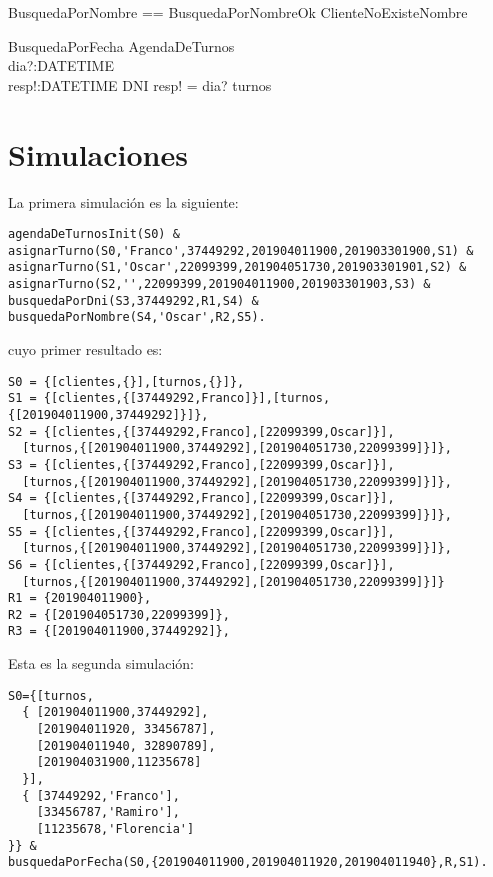 \documentclass[%
  fleqn,colorlinks,linkcolor=blue,citecolor=blue,urlcolor=blue]{eptcs}
\begin{document}
  \begin{zed}
  BusquedaPorNombre == BusquedaPorNombreOk \lor ClienteNoExisteNombre
  \end{zed}

  \begin{schema}{BusquedaPorFecha}
  \Xi AgendaDeTurnos \\
  dia?:\power DATETIME \\
  resp!:DATETIME \pfun DNI
  \where
  resp! = dia? \dres turnos
  \end{schema}

\section{Simulaciones}

La primera simulaci\'on es la siguiente:

\begin{verbatim}
agendaDeTurnosInit(S0) &
asignarTurno(S0,'Franco',37449292,201904011900,201903301900,S1) &
asignarTurno(S1,'Oscar',22099399,201904051730,201903301901,S2) &
asignarTurno(S2,'',22099399,201904011900,201903301903,S3) &
busquedaPorDni(S3,37449292,R1,S4) & busquedaPorNombre(S4,'Oscar',R2,S5).
\end{verbatim}
cuyo primer resultado es:
\begin{verbatim}
S0 = {[clientes,{}],[turnos,{}]},
S1 = {[clientes,{[37449292,Franco]}],[turnos,{[201904011900,37449292]}]},
S2 = {[clientes,{[37449292,Franco],[22099399,Oscar]}],
  [turnos,{[201904011900,37449292],[201904051730,22099399]}]},
S3 = {[clientes,{[37449292,Franco],[22099399,Oscar]}],
  [turnos,{[201904011900,37449292],[201904051730,22099399]}]},
S4 = {[clientes,{[37449292,Franco],[22099399,Oscar]}],
  [turnos,{[201904011900,37449292],[201904051730,22099399]}]},
S5 = {[clientes,{[37449292,Franco],[22099399,Oscar]}],
  [turnos,{[201904011900,37449292],[201904051730,22099399]}]},
S6 = {[clientes,{[37449292,Franco],[22099399,Oscar]}],
  [turnos,{[201904011900,37449292],[201904051730,22099399]}]}
R1 = {201904011900},
R2 = {[201904051730,22099399]},
R3 = {[201904011900,37449292]},
\end{verbatim}

Esta es la segunda simulaci\'on:

\begin{verbatim}
S0={[turnos,
  { [201904011900,37449292],
    [201904011920, 33456787],
    [201904011940, 32890789],
    [201904031900,11235678]
  }],
  { [37449292,'Franco'],
    [33456787,'Ramiro'],
    [11235678,'Florencia']
}} &
busquedaPorFecha(S0,{201904011900,201904011920,201904011940},R,S1).
\end{verbatim}
\end{document}
